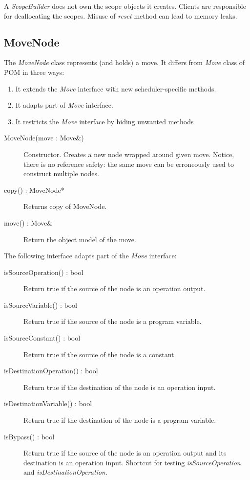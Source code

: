 \documentclass[a4paper,twoside]{tce}
\begin{document}
A \emph{ScopeBuilder} does not own the scope objects it creates. Clients are
responsible for deallocating the scopes. Misuse of \emph{reset} method can
lead to memory leaks.
%

\subsection{MoveNode}

The \emph{MoveNode} class represents (and holds) a move. It differs from
\emph{Move} class of POM in three ways:
\begin{enumerate}
\item %
  It extends the \emph{Move} interface with new scheduler-specific methods.
\item %
  It adapts part of \emph{Move} interface.
\item %
  It restricts the \emph{Move} interface by hiding unwanted methods
\end{enumerate}

\begin{description}
\item[MoveNode(move : Move\&)]%
  Constructor. Creates a new node wrapped around given move. Notice, there
  is no reference safety: the same move can be erroneously used to construct
  multiple nodes.
\item[copy() : MoveNode*]%
  Returns copy of MoveNode.
\item[move() : Move\&]%
  Return the object model of the move.
\end{description}

The following interface adapts part of the \emph{Move} interface:
\begin{description}
\item[isSourceOperation() : bool]%
  Return true if the source of the node is an operation output.
\item[isSourceVariable() : bool]%
  Return true if the source of the node is a program variable.
\item[isSourceConstant() : bool]%
  Return true if the source of the node is a constant.
\item[isDestinationOperation() : bool]%
  Return true if the destination of the node is an operation input.
\item[isDestinationVariable() : bool]%
  Return true if the destination of the node is a program variable.
\item[isBypass() : bool]%
  Return true if the source of the node is an operation output and its
  destination is an operation input. Shortcut for testing
  \emph{isSourceOperation} and \emph{isDestinationOperation}.
\end{description}
\end{document}
